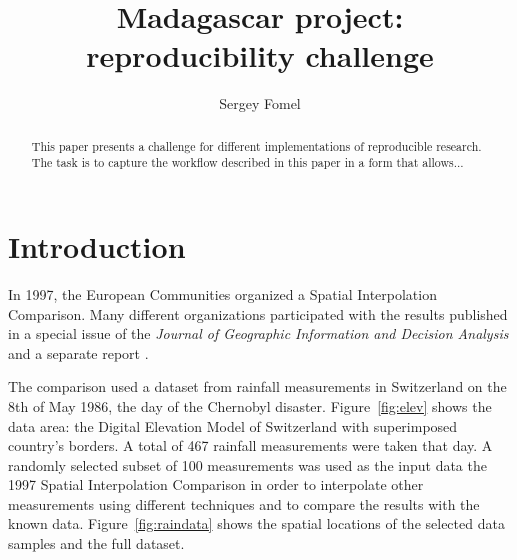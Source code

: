 \title{Madagascar project: reproducibility challenge}

\author{Sergey Fomel}


\address {
sergey.fomel@beg.utexas.edu \\
Jackson School of Geosciences \\
The University of Texas at Austin \\ 
University Station, Box X \\
Austin, TX 78713-8924 \\
USA}

\maketitle


\begin{abstract}
This paper presents a challenge for different implementations of
reproducible research. The task is to capture the workflow described
in this paper in a form that allows...
\end{abstract}

\section{Introduction}

In 1997, the European Communities organized a Spatial Interpolation
Comparison. Many different organizations participated with the results
published in a special issue of the \emph{Journal of Geographic
Information and Decision Analysis} \cite[]{dubois} and a separate
report \cite[]{rain}.


The comparison used a dataset from rainfall measurements in
Switzerland on the 8th of May 1986, the day of the Chernobyl disaster.
Figure~\ref{fig:elev} shows the data area: the Digital Elevation Model
of Switzerland with superimposed country's borders.  A total of 467
rainfall measurements were taken that day. A randomly selected subset
of 100 measurements was used as the input data the 1997 Spatial
Interpolation Comparison in order to interpolate other measurements
using different techniques and to compare the results with the known
data. Figure~\ref{fig:raindata} shows the spatial locations of the
selected data samples and the full dataset.


